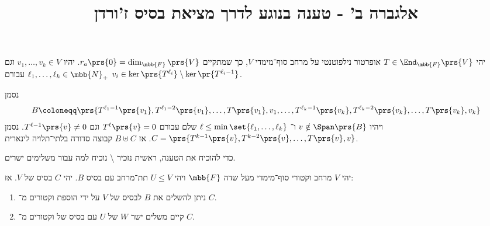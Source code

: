 \documentclass[a4paper,10pt,twoside,openany]{article}
\title{
אלגברה ב' - טענה בנוגע לדרך מציאת בסיס ז'ורדן
}
\date{}
\begin{document}
\maketitle

\begin{propositionstarred}
יהי
$T \in \End_{\mbb{F}}\prs{V}$
אופרטור נילפוטנטי על מרחב סוף־מימדי
$V$,
כך שמתקיים
$r_a\prs{0} = \dim_{\mbb{F}}\prs{V}$.
יהיו
$v_1, \ldots, v_k \in V$
וגם
$\ell_1, \ldots, \ell_k \in \mbb{N}_+$
עבורם
$v_i \in \ker\prs{T^{\ell_i}} \setminus \ker\pr{T^{\ell_i - 1}}$.

נסמן
\begin{align*}
B \coloneqq \prs{T^{\ell_1 - 1}\prs{v_1}, T^{\ell_1 - 2}\prs{v_1}, \ldots, T\prs{v_1}, v_1, \ldots, T^{\ell_k - 1}\prs{v_k}, T^{\ell_k - 2}\prs{v_k}, \ldots, T\prs{v_k}, v_k}
\end{align*}
ויהיו
$v \notin \Span\prs{B}$
ו־%
$\ell \leq \min\set{\ell_1, \ldots, \ell_k}$
שלם
עבורם
$T^\ell\prs{v} = 0$
וגם
$T^{\ell-1}\prs{v} \neq 0$.
נסמן
$C = \prs{T^{k-1}\prs{v}, T^{k-2}\prs{v}, \ldots, T\prs{v}, v}$.
אז
$B \uplus C$
קבוצה סדורה בלתי־תלויה לינארית.
\end{propositionstarred}

כדי להוכיח את הטענה, ראשית נזכיר%
\textbackslash
נוכיח למה עבור משלימים ישרים.

\begin{lemma} \label{lemma:complete-from-basis}
יהי
$V$
מרחב וקטורי סוף־מימדי מעל שדה
$\mbb{F}$
ויהי
$U \leq V$
תת־מרחב עם בסיס
$B$.
יהי
$C$
בסיס של
$V$.
אז:

\begin{enumerate}
\item ניתן להשלים את
$B$
לבסיס של
$V$
על ידי הוספת וקטורים מ־%
$C$.

\item קיים משלים ישר
$W$
של
$U$
עם בסיס של וקטורים מ־%
$C$.
\end{enumerate}
\end{lemma}
\end{document}
